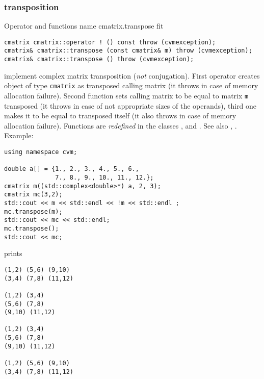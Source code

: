 \subsubsection{transposition}
Operator and functions%
\pdfdest name {cmatrix.transpose} fit
\begin{verbatim}
cmatrix cmatrix::operator ! () const throw (cvmexception);
cmatrix& cmatrix::transpose (const cmatrix& m) throw (cvmexception);
cmatrix& cmatrix::transpose () throw (cvmexception);
\end{verbatim}
implement complex matrix transposition (\emph{not} conjugation).
First operator creates  object of type \verb"cmatrix" as
transposed calling matrix
(it throws  
in case of memory allocation failure). 
Second function sets  calling matrix to be equal to  matrix
\verb"m" transposed
(it throws  
in case of not appropriate sizes of the operands), 
third one makes it to be equal to
transposed itself (it also throws  
in case of memory allocation failure). 
Functions are \emph{redefined} in the classes
,  
and .
See also , .
Example:
\begin{Verbatim}
using namespace cvm;

double a[] = {1., 2., 3., 4., 5., 6.,
              7., 8., 9., 10., 11., 12.};
cmatrix m((std::complex<double>*) a, 2, 3);
cmatrix mc(3,2);
std::cout << m << std::endl << !m << std::endl ;
mc.transpose(m);
std::cout << mc << std::endl;
mc.transpose();
std::cout << mc;
\end{Verbatim}
prints
\begin{Verbatim}
(1,2) (5,6) (9,10)
(3,4) (7,8) (11,12)

(1,2) (3,4)
(5,6) (7,8)
(9,10) (11,12)

(1,2) (3,4)
(5,6) (7,8)
(9,10) (11,12)

(1,2) (5,6) (9,10)
(3,4) (7,8) (11,12)
\end{Verbatim}
\newpage














